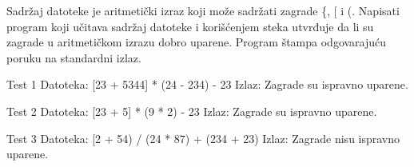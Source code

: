 \begin{Exercise}[label=608]
Sadržaj datoteke je aritmetički izraz koji može sadržati zagrade \{, [ i (. 
Napisati program koji učitava sadržaj datoteke i korišćenjem steka 
utvrđuje da li su zagrade u aritmetičkom izrazu 
dobro uparene. Program štampa odgovarajuću poruku na standardni izlaz.

\begin{maxitest}
  \begin{test}{Test 1}
Datoteka: {[23 + 5344] * (24 - 234)} - 23
Izlaz:  Zagrade su ispravno uparene.
  \end{test}
\end{maxitest}

\begin{maxitest}
  \begin{test}{Test 2}
Datoteka: {[23 + 5] * (9 * 2)} - {23}
Izlaz:  Zagrade su ispravno uparene.
  \end{test}
\end{maxitest}

\begin{maxitest}
  \begin{test}{Test 3}
Datoteka: {[2 + 54) / (24 * 87)} + (234 + 23)
Izlaz:  Zagrade nisu ispravno uparene.
  \end{test}
\end{maxitest}

\end{Exercise}
\begin{Answer}[ref=608]
\end{Answer}


